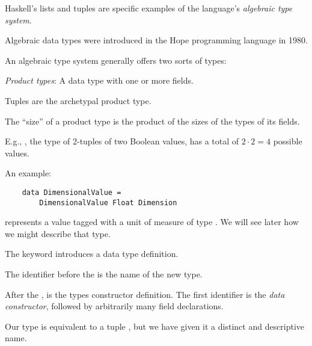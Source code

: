 \begin{notelist}
\item Haskell's lists and tuples are specific examples of the language's \textit{algebraic type system}.
\item Algebraic data types were introduced in the Hope programming language in 1980. \cite{hope}
\item An algebraic type system generally offers two sorts of types:
\begin{notelist}
    \item \textit{Product types}: A data type with one or more fields.
    \begin{notelist}
        \item Tuples are the archetypal product type.
        \item The ``size'' of a product type is the product of the sizes of the types of its fields.
        \item E.g., , the type of 2-tuples of two Boolean values, has a total of $2 \cdot 2 = 4$ 
              possible values.
    \end{notelist}
    \item An example:
    \begin{lstlisting}
    data DimensionalValue =
        DimensionalValue Float Dimension
    \end{lstlisting}
    \begin{notelist}
        \item {} represents a  value tagged with a unit of measure
              of type . We will see later how we might describe that type.
        \item The  keyword introduces a data type definition.
        \item The identifier before the \code{=} is the name of the new type.
        \item After the \code{=}, is the types constructor definition. The first identifier is the
              \textit{data constructor}, followed by arbitrarily many field declarations. 
        \item Our  type is equivalent to a tuple ,
              but we have given it a distinct and descriptive name.
    \end{notelist}
    

\end{notelist}
\end{notelist}
